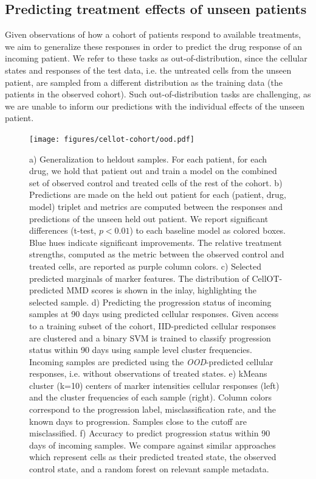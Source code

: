 \subsection{Predicting treatment effects of unseen patients}
Given observations of how a cohort of patients respond to available treatments, we aim to generalize these responses in order to predict the drug response of an incoming patient.
We refer to these tasks as out-of-distribution, since the cellular states and responses of the test data, i.e. the untreated cells from the unseen patient, are sampled from a different distribution as the training data (the patients in the observed cohort).
Such out-of-distribution tasks are challenging, as we are unable to inform our predictions with the individual effects of the unseen patient.


\begin{figure}[htp!]
  \begin{center}
    \texttt{[image: figures/cellot-cohort/ood.pdf]}
  \end{center}
  \caption{
    a) Generalization to heldout samples. For each patient, for each drug, we hold that patient out and train a model on the combined set of observed control and treated cells of the rest of the cohort.
    b) Predictions are made on the held out patient for each (patient, drug, model) triplet and metrics are computed between the responses and predictions of the unseen held out patient.
    We report significant differences (t-test, $p < 0.01$) to each baseline model as colored boxes. Blue hues indicate significant improvements.
    The relative treatment strengths, computed as the metric between the observed control and treated cells, are reported as purple column colors.
    c) Selected predicted marginals of marker features.
    The distribution of CellOT-predicted MMD scores is shown in the inlay, highlighting the selected sample.
    d) Predicting the progression status of incoming samples at 90 days using predicted cellular responses.
    Given access to a training subset of the cohort, IID-predicted cellular responses are clustered and a binary SVM is trained to classify progression status within 90 days using sample level cluster frequencies.
    Incoming samples are predicted using the \emph{OOD}-predicted cellular responses, i.e. without observations of treated states.
    e) kMeans cluster (k=10) centers of marker intensities cellular responses (left) and the cluster frequencies of each sample (right).
    Column colors correspond to the progression label, misclassification rate, and the known days to progression. Samples close to the cutoff are misclassified.
    f) Accuracy to predict progression status within 90 days of incoming samples.
    We compare against similar approaches which represent cells as their predicted treated state, the observed control state, and a random forest on relevant sample metadata.
  }\label{fig:ood-main}
\end{figure}

